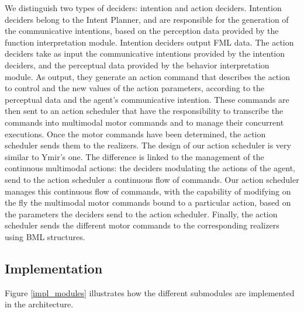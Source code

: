 We distinguish two types of deciders: intention and action deciders. 
Intention deciders belong to the Intent Planner, and are responsible for the generation of the communicative intentions, based on the perception data provided by the function interpretation module. Intention deciders output FML data. 
The action deciders take as input the communicative intentions provided by the intention deciders, and the perceptual data provided by the behavior interpretation module. As output, they generate an action command that describes the action to control and the new values of the action parameters, according to the perceptual data and the agent's communicative intention. 
These commands are then sent to an action scheduler that have the responsibility to transcribe the commands into multimodal motor commands and to manage their concurrent executions. Once the motor commands have been determined, the action scheduler sends them to the realizers. 
The design of our action scheduler is very similar to Ymir's one. The difference is linked to the management of the continuous multimodal actions: the deciders modulating the actions of the agent, send to the action scheduler a continuous flow of commands. Our action scheduler manages this continuous flow of commands, with the capability of modifying on the fly the multimodal motor commands bound to a particular action, based on the parameters the deciders send to the action scheduler. 
Finally, the action scheduler sends the different motor commands to the corresponding realizers using BML structures. 

\subsection{Implementation}


Figure \ref{impl_modules} illustrates how the different submodules are implemented in the architecture. 

